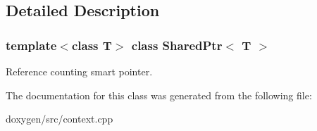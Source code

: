\subsection{Detailed Description}
\subsubsection*{template$<$class T$>$\newline
class Shared\+Ptr$<$ T $>$}

Reference counting smart pointer. 

The documentation for this class was generated from the following file\+:\begin{DoxyCompactItemize}
\item 
doxygen/src/context.\+cpp\end{DoxyCompactItemize}
